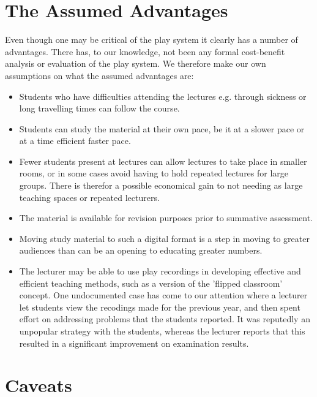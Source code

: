 \documentclass[a4paper,10pt]{article}
\begin{document}
\section{The Assumed Advantages}
 Even though one may be critical of the play system it clearly has a number of advantages. There has, to our knowledge, not been any formal cost-benefit analysis or evaluation of the play system. We therefore make our own assumptions on what the assumed advantages are:

 \begin{itemize}
   \item Students who have difficulties attending the lectures e.g. through sickness or long travelling times can follow the course.

   \item Students can study the material at their own pace, be it at a slower pace or at a time efficient faster pace.

   \item Fewer students present at lectures can allow lectures to take place in smaller rooms, or in some cases avoid having to hold repeated lectures for large groups. There is therefor a possible economical gain to not needing as large teaching spaces or repeated lecturers.

   \item The material is available for revision purposes prior to summative assessment.

   \item Moving study material to such a digital format is a step in moving to greater audiences than can be an opening to educating greater numbers.
     
   \item The lecturer may be able to use play recordings in developing effective and efficient teaching methods, such as a version of the 'flipped classroom' concept. One undocumented case has come to our attention where a lecturer let students view the recodings made for the previous year, and then spent effort on addressing problems that the students reported. It was reputedly an unpopular strategy with the students, whereas the lecturer reports that this resulted in a significant improvement on examination results.

     
 \end{itemize}
 


 \section{Caveats}
\end{document}
